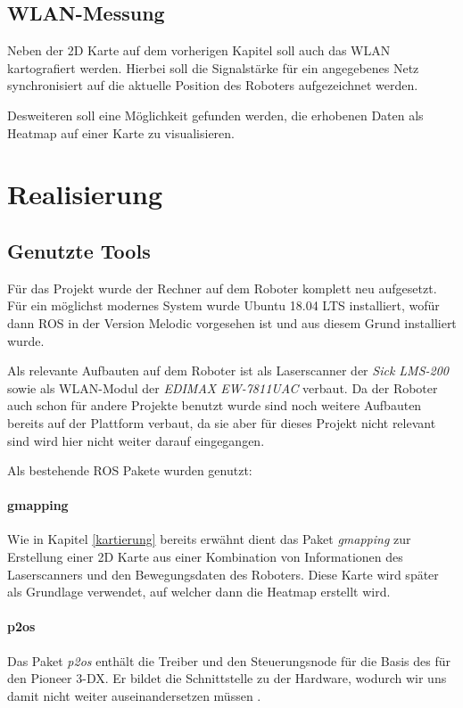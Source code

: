 \documentclass{scrartcl}%
\begin{document}
\subsection{WLAN-Messung}
Neben der 2D Karte auf dem vorherigen Kapitel soll auch das WLAN kartografiert werden. Hierbei soll die Signalstärke für ein angegebenes Netz synchronisiert auf die aktuelle Position des Roboters aufgezeichnet werden.

Desweiteren soll eine Möglichkeit gefunden werden, die erhobenen Daten als Heatmap auf einer Karte zu visualisieren.

\newpage
\section{Realisierung}
\subsection{Genutzte Tools}
Für das Projekt wurde der Rechner auf dem Roboter komplett neu aufgesetzt. Für ein möglichst modernes System wurde Ubuntu 18.04 LTS installiert, wofür dann ROS in der Version Melodic vorgesehen ist und aus diesem Grund installiert wurde.

Als relevante Aufbauten auf dem Roboter ist als Laserscanner der \textit{Sick LMS-200} sowie als WLAN-Modul der \textit{EDIMAX EW-7811UAC} verbaut. Da der Roboter auch schon für andere Projekte benutzt wurde sind noch weitere Aufbauten bereits auf der Plattform verbaut, da sie aber für dieses Projekt nicht relevant sind wird hier nicht weiter darauf eingegangen.

Als bestehende ROS Pakete wurden genutzt:

\paragraph{gmapping}
Wie in Kapitel \ref{kartierung} bereits erwähnt dient das Paket \textit{gmapping} zur Erstellung einer 2D Karte aus einer Kombination von Informationen des Laserscanners und den Bewegungsdaten des Roboters. Diese Karte wird später als Grundlage verwendet, auf welcher dann die Heatmap erstellt wird.

\paragraph{p2os}
Das Paket \textit{p2os} enthält die Treiber und den Steuerungsnode für die Basis des für den Pioneer 3-DX. Er bildet die Schnittstelle zu der Hardware, wodurch wir uns damit nicht weiter auseinandersetzen müssen \cite{p2os}. 
\end{document}
